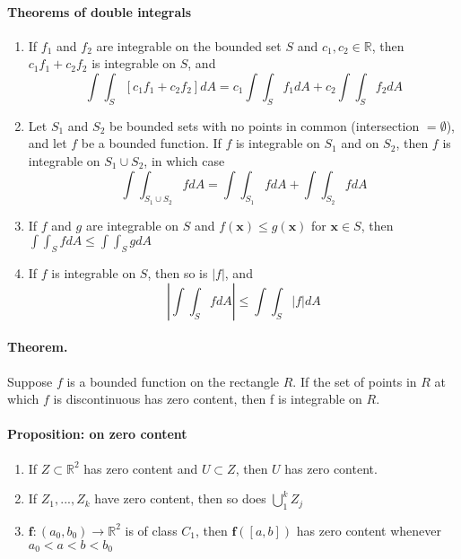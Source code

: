 \documentclass[11pt]{article}
\newcommand{\bx}[0]{\mathbf{x}}
\newcommand{\real}[0]{\mathbb{R}}
\begin{document}
\paragraph{Theorems of double integrals}
\begin{enumerate}
    \item If $f_1$ and $f_2$ are integrable on the bounded set $S$ and $c_1,c_2\in \real$, then $c_1f_1 + c_2f_2$ is integrable on $S$, and
    \begin{equation*}
        \int\int_S[c_1f_1 + c_2f_2]dA = c_1\int\int_Sf_1dA + c_2\int\int_Sf_2dA
    \end{equation*}
    
    \item Let $S_1$ and $S_2$ be bounded sets with no points in common (intersection $ =\emptyset$), and let $f$ be a bounded function. If $f$ is integrable on $S_1$ and on $S_2$, then $f$ is integrable on $S_1\cup S_2$, in which case
    \begin{equation*}
        \int\int_{S_1\cup S_2}fdA = \int\int_{S_1}fdA + \int\int_{S_2} fdA
    \end{equation*}
    
    \item If $f$ and $g$ are integrable on $S$ and $f(\mathbf{x})\leq g(\mathbf{x})$ for $\bx \in S$, then $\int\int_S fdA \leq \int\int_S g dA$
    
    \item If $f$ is integrable on $S$, then so is $|f|$, and
    \begin{equation*}
        \left|\int\int_Sf dA\right| \leq \int\int_S|f|dA
    \end{equation*}
\end{enumerate}

\paragraph{Theorem.} Suppose $f$ is a bounded function on the rectangle $R$. If the set of points in $R$ at which $f$ is discontinuous has zero content, then f is integrable on $R$.

\paragraph{Proposition: on zero content} 
\begin{enumerate}
    \item If $Z\subset \real^2$ has zero content and $U\subset Z$, then $U$ has zero content.
    \item If $Z_1,...,Z_k$ have zero content, then so does $\bigcup_1^k Z_j$
    \item $\mathbf{f}:(a_0, b_0) \xrightarrow{} \real^2$ is of class $C_1$, then $\mathbf{f}([a,b])$ has zero content whenever $a_0<a<b<b_0$
\end{enumerate}
\end{document}
